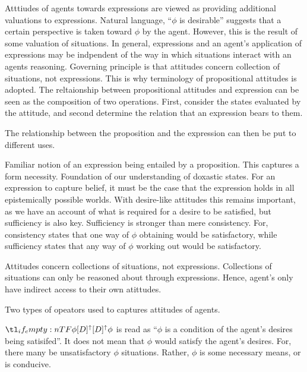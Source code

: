 \documentclass[10pt]{article}
\def\ltrans{\mathrel{%
    /%
  }}
\begin{document}
Atttiudes of agents towards expressions are viewed as providing additional valuations to expressions.
Natural language, ``\(\phi\) is desirable'' suggests that a certain perspective is taken toward \(\phi\) by the agent.
However, this is the result of some valuation of situations.
In general, expressions and an agent's application of expressions may be indpendent of the way in which situations interact with an agents reasoning.
Governing principle is that attitudes concern collection of situations, not expressions.
This is why terminology of propositional attitudes is adopted.
The reltaionship between propositional attitudes and expression can be seen as the composition of two operations.
First, consider the states evaluated by the attitude, and second determine the relation that an expression bears to them.

The relationship between the proposition and the expression can then be put to different uses.

Familiar notion of an expression being entailed by a proposition.
This captures a form necessity.
Foundation of our understanding of doxastic states.
For an expression to capture belief, it must be the case that the expression holds in all epistemically possible worlds.
With desire-like attitudes this remains important, as we have an account of what is required for a desire to be satisfied, but sufficiency is also key.
Sufficiency is stronger than mere consistency.
For, consistency states that one way of \(\phi\) obtaining would be satisfactory, while sufficiency states that any way of \(\phi\) working out would be satisfactory.

Attitudes concern collections of situations, not expressions.
Collections of situations can only be reasoned about through expressions.
Hence, agent's only have indirect access to their own atittudes.







Two types of opeators used to captures attitudes of agents.




\(\lattu[D]{\phi}\) is read as ``\(\phi\) is a condition of the agent's desires being satisifed''.
It does not mean that \(\phi\) would satisfy the agent's desires.
For, there many be unsatisfactory \(\phi\) situations.
Rather, \(\phi\) is some necessary means, or is conducive.
\end{document}
